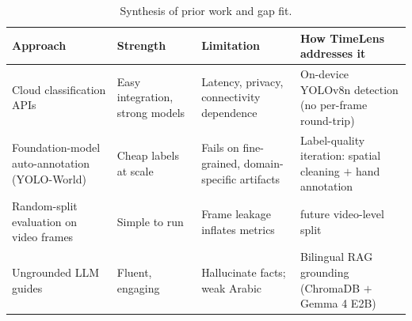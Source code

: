 \begin{table}[htbp]
\centering
\caption{Synthesis of prior work and gap fit.}
\label{tab:gaps}
\begin{tabularx}{\textwidth}{@{}>{\raggedright\arraybackslash}p{}>{\raggedright\arraybackslash}p{}>{\raggedright\arraybackslash}p{}>{\raggedright\arraybackslash}X@{}}
\toprule
\textbf{Approach} & \textbf{Strength} & \textbf{Limitation} & \textbf{How TimeLens addresses it}\\
\midrule
Cloud classification APIs & Easy integration, strong models & Latency, privacy, connectivity dependence & On-device YOLOv8n detection (no per-frame round-trip)\\
Foundation-model auto-annotation (YOLO-World) & Cheap labels at scale & Fails on fine-grained, domain-specific artifacts & Label-quality iteration: spatial cleaning $+$ hand annotation\\
Random-split evaluation on video frames & Simple to run & Frame leakage inflates metrics & future video-level split\\
Ungrounded LLM guides & Fluent, engaging & Hallucinate facts; weak Arabic & Bilingual RAG grounding (ChromaDB $+$ Gemma 4 E2B)\\
\bottomrule
\end{tabularx}
\end{table}
